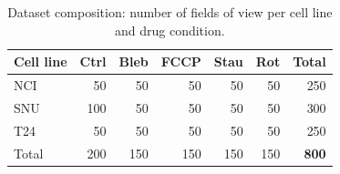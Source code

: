 \begin{table}[!htbp]
\centering
\caption{Dataset composition: number of fields of view per cell line and drug
condition.}
\label{tab:dataset}
\footnotesize
\begin{tabular*}{\textwidth}{@{\extracolsep{\fill}}lrrrrrr@{}}
\toprule
Cell line & Ctrl & Bleb & FCCP & Stau & Rot & Total \\
\midrule
NCI   &  50 &  50 &  50 &  50 &  50 & 250 \\
SNU   & 100 &  50 &  50 &  50 &  50 & 300 \\
T24   &  50 &  50 &  50 &  50 &  50 & 250 \\
\midrule
Total & 200 & 150 & 150 & 150 & 150 & \textbf{800} \\
\bottomrule
\end{tabular*}
\end{table}
